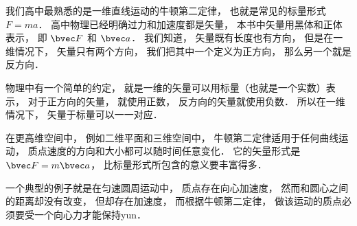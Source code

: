 
我们高中最熟悉的是一维直线运动的牛顿第二定律， 也就是常见的标量形式 $F = ma$． 高中物理已经明确过力和加速度都是矢量， 本书中矢量用黑体和正体表示， 即 $\bvec F$ 和 $\bvec a$． 我们知道， 矢量既有长度也有方向， 但是在一维情况下， 矢量只有两个方向， 我们把其中一个定义为正方向， 那么另一个就是反方向． 

物理中有一个简单的约定， 就是一维的矢量可以用标量（也就是一个实数）表示， 对于正方向的矢量， 就使用正数， 反方向的矢量就使用负数． 所以在一维情况下， 矢量于标量可以一一对应．

在更高维空间中， 例如二维平面和三维空间中， 牛顿第二定律适用于任何曲线运动， 质点速度的方向和大小都可以随时间任意变化． 它的矢量形式是 $\bvec F = m\bvec a$， 比标量形式所包含的意义要丰富得多．

一个典型的例子就是在匀速圆周运动中， 质点存在向心加速度， 然而和圆心之间的距离却没有改变， 但却存在加速度， 而根据牛顿第二定律， 做该运动的质点必须要受一个向心力才能保持yun．



